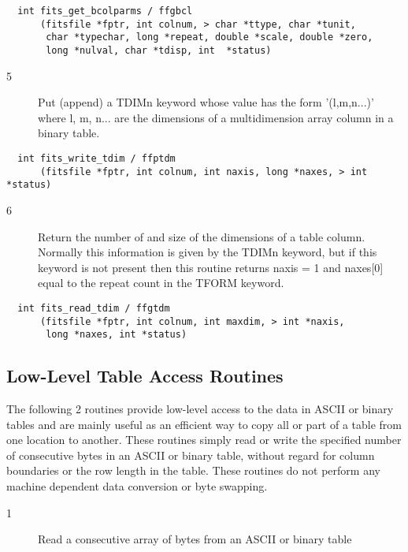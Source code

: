 \begin{verbatim}
  int fits_get_bcolparms / ffgbcl
      (fitsfile *fptr, int colnum, > char *ttype, char *tunit,
       char *typechar, long *repeat, double *scale, double *zero,
       long *nulval, char *tdisp, int  *status)
\end{verbatim}

\begin{description}
\item[ 5] Put (append) a TDIMn keyword whose value has the form '(l,m,n...)'
    where l, m, n... are the dimensions of a multidimension array
   column in a binary table.
\end{description}

\begin{verbatim}
  int fits_write_tdim / ffptdm
      (fitsfile *fptr, int colnum, int naxis, long *naxes, > int *status)
\end{verbatim}

\begin{description}
\item[ 6] Return the number of and size of the dimensions of a table column.
    Normally this information is given by the TDIMn keyword, but if
    this keyword is not present then this routine returns naxis = 1
   and naxes[0] equal to the repeat count in the TFORM keyword.
\end{description}

\begin{verbatim}
  int fits_read_tdim / ffgtdm
      (fitsfile *fptr, int colnum, int maxdim, > int *naxis,
       long *naxes, int *status)
\end{verbatim}

\subsection{Low-Level Table Access Routines \label{FFGTBB}}

The following 2 routines provide low-level access to the data in ASCII
or binary tables and are mainly useful as an efficient way to copy all
or part of a table from one location to another.  These routines simply
read or write the specified number of consecutive bytes in an ASCII or
binary table, without regard for column boundaries or the row length in
the table.  These routines do not perform any machine dependent data
conversion or byte swapping.


\begin{description}
\item[1 ] Read a consecutive array of bytes from an ASCII or binary table
\end{description}

